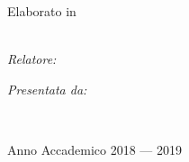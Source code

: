 \documentclass[
12pt, %
italian, %
singlespacing, %
draft, %
parskip, %
headsepline, %
]{MastersDoctoralThesis} %
\author{Leonardo \textsc{Marini}} %
\begin{document}
\frontmatter %

\pagestyle{plain} %


\begin{titlepage}
\begin{center}

\vspace*{.06\textheight}
{\scshape \MakeUppercase{\univname}\\\campname\par}\vspace{1.5cm} %
\textsc{\deptname\\\facname}\\ %

\vfill
\HRule \\[0.4cm] %
{\huge \bfseries \ttitle\par}\vspace{0.4cm} %
\HRule \\[1.5cm] %
 
\vfill
\large {Elaborato in \\\textit{\subjectname}}\\[0.3cm] %
\vfill

\begin{minipage}[t]{0.4\textwidth}
\begin{flushleft} \large
\emph{Relatore:}\\
\href{https://www.unibo.it/sitoweb/damiana.lazzaro}{\supname} %
\end{flushleft}
\end{minipage}
\begin{minipage}[t]{0.4\textwidth}
\begin{flushright} \large
\emph{Presentata da:} \\
\href{https://www.linkedin.com/in/leonardo-marini-it/}{\authorname} %
\end{flushright}
\end{minipage}\\[3cm]
 
\vfill

{\large Anno Accademico 2018 --- 2019}\\[4cm] %
 
\vfill
\end{center}
\end{titlepage}
\end{document}
